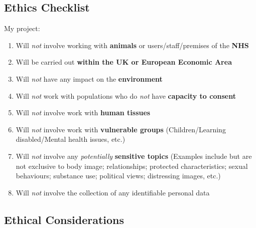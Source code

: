 \documentclass[a4paper]{article}
\begin{document}
\subsection{Ethics Checklist}
My project:
\begin{enumerate}
    \item Will \textit{not} involve working with \textbf{animals} or
        users/staff/premises of the \textbf{NHS}
    \item Will be carried out \textbf{within the UK or European
        Economic Area}
    \item Will \textit{not} have any impact on the \textbf{environment}
    \item Will \textit{not} work with populations who do \textit{not}
        have \textbf{capacity to consent}
    \item Will \textit{not} involve work with \textbf{human tissues}
    \item Will \textit{not} involve work with \textbf{vulnerable groups}
        (Children/Learning disabled/Mental health issues, etc.)
    \item Will \textit{not} involve any \textit{potentially}
        \textbf{sensitive topics} (Examples include but are not
        exclusive to body image; relationships; protected
        characteristics; sexual behaviours; substance use;
        political views; distressing images, etc.)
    \item Will \textit{not} involve the collection of any identifiable
        personal data
\end{enumerate}

\subsection{Ethical Considerations}

\clearpage


\nocite{*}
\printbibliography[heading=bibnumbered]
\end{document}
